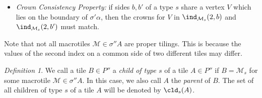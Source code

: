 \documentclass[12pt]{article}
\theoremstyle{remark}
\newtheorem{definition}{Definition}
\begin{document}
\begin{itemize}
\begin{enumerate}
\item The second index on side $b$ is equal to some
crown index of side
$b$ of type $s$, that is, $\ind_{\mathcal M_s}(2,b)\in C_s(b)$,
\item The third index on side $b$
is equal to the $i$th index on side $a$ of tile $A$, that is,
$\ind_{\mathcal M_s}(3,b)=\ind_A(i,a)$ if $b\in P_i(a)$ (recall that there is at most one such path) %
and $\ind_{\mathcal M_s}(3,b)=0$ otherwise. In particular, if  $b$ is the $i$th port on macroside $\sigma' a$,
then $\ind_{\mathcal M_s}(3,b)=\ind_A(i,a)$ (recall that  $i$th port on macroside $\sigma' a$ always belongs to $P_i(a)$).
\item
The fourth index on side $b$
is equal to $A_s(b)$ if
$b$ is an outer side of type $s$,
is equal to the sixth index of the tile
$A$ if $b$ is a boundary side of type $s$, and is zero otherwise.
For this reason, the fourth index of boundary
sides will be called \emph{the parent index}.
\item
The fifth index on side $b$
is zero. \end{enumerate}
Finally, there is one more constraint on the choice of the second index of outer and boundary sides:
\item \textit{Crown Consistency Property:} if sides $b,b'$ of a type $s$ share a vertex $V$
which lies on the boundary of $\sigma'\alpha$,
then the crowns for $V$ in $\ind_{\mathcal M_s}(2,b)$ and $\ind_{\mathcal M_s}(2,b')$ must match.

\end{itemize}
Note that not all macrotiles $\mathcal M\in\sigma'' A$ are proper tilings.
This is because the values of the second index 
on a common side of two different tiles may differ.

\begin{definition}
We call a tile $B\in P''$ a \emph{child of type $s$} of a tile $A\in P''$ if $B=\mathcal M_s$ for some macrotile
$\mathcal M\in \sigma''A$. In this case, we also call $A$ the \emph{parent} of $B$.
The set of all children of type $s$ of a tile $A$ will be denoted by $\cld_s(A)$.
\end{definition}
\end{document}
